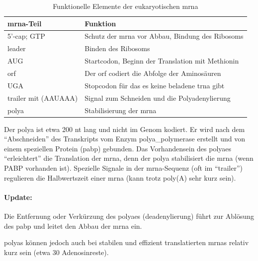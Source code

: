 \begin{table}[ht]
    \centering
    \renewcommand{\arraystretch}{1.3}
    \begin{tabular}{|l|p{10cm}|}
        \hline
        \textbf{\gls{mrna}-Teil} & \textbf{Funktion} \\
        \hline
        5'-\gls{cap}; GTP & Schutz der \gls{mrna} vor Abbau, Bindung des Ribosoms \\
        \hline
        \gls{leader} & Binden des Ribosoms \\
        \hline
        AUG & Startcodon, Beginn der Translation mit Methionin \\
        \hline
        \gls{orf} & Der \gls{orf} codiert die Abfolge der Aminosäuren \\
        \hline
        UGA & Stopcodon für das es keine beladene \gls{trna} gibt \\
        \hline
        \gls{trailer} mit (AAUAAA) & Signal zum Schneiden und die Polyadenylierung \\
        \hline
        \gls{polya} & Stabilisierung der \gls{mrna} \\
        \hline
    \end{tabular}
    \caption{Funktionelle Elemente der eukaryotischen \gls{mrna}}
    \label{tab:mrna}
\end{table}


Der \gls{polya} ist etwa 200 nt lang und nicht im Genom kodiert.
Er wird nach dem ``Abschneiden'' des Transkripts vom Enzym \gls{polya_polymerase} erstellt und von einem speziellen
Protein (\gls{pabp}) gebunden.
Das Vorhandensein des \gls{polya}es ``erleichtert'' die
Translation der \gls{mrna}, denn der \gls{polya} stabilisiert die \gls{mrna} (wenn PABP
vorhanden ist).
Spezielle Signale in der \gls{mrna}-Sequenz (oft im ``\gls{trailer}'')
regulieren die Halbwertszeit einer \gls{mrna} (kann trotz poly(A)
sehr kurz sein).

\paragraph{Update:} Die Entfernung oder Verkürzung des \gls{polya}es (\gls{deadenylierung}) führt zur Ablösung des \gls{pabp} und leitet den Abbau der \gls{mrna} ein.

\glspl{polya} können jedoch auch bei stabilen und effizient translatierten \gls{mrna}s relativ kurz sein (etwa 30
Adenosinreste).

